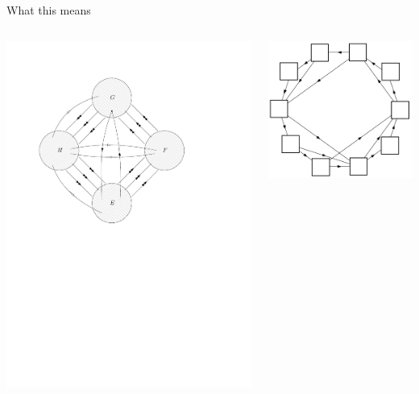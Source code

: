\documentclass{beamer}
\begin{document}
\begin{frame}{What this means}
	\begin{columns}
        \centering
        \includegraphics[scale=0.3]{Images/4blobs.pdf}

        \centering
        \includegraphics[scale=0.3]{Images/decomposition.png}
    \end{columns}
\end{frame}
\end{document}
